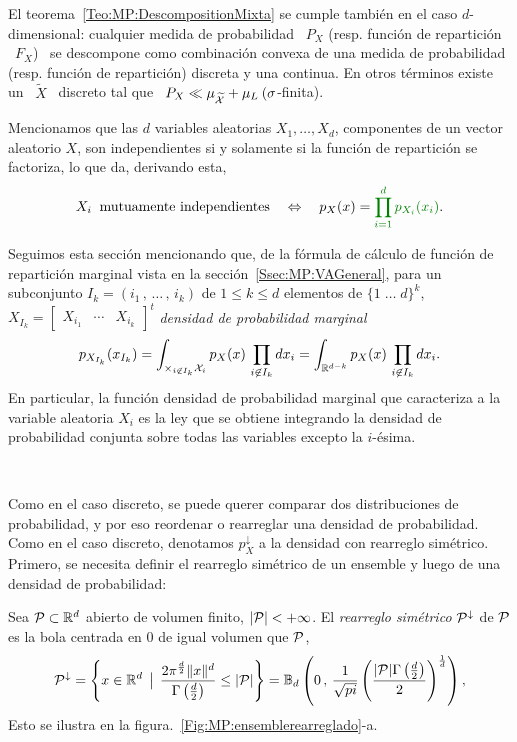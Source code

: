 El                                      teorema~\ref{Teo:MP:DescompositionMixta}
se cumple tambi\'en en el caso $d$-dimensional: cualquier medida de probabilidad
\  $P_X$  (resp.  funci\'on  de  repartici\'on \  $F_X$)  \  se descompone  como
combinaci\'on  convexa  de  una  medida  de probabilidad  (resp.   funci\'on  de
repartici\'on)  discreta  y una  continua.   En  otros  t\'erminos existe  un  \
$\widetilde{X}$ \  discreto tal que \  $P_X \ll \mu_{\widetilde{\X}}  + \mu_L \:
(\sigma$-finita).

Mencionamos que las $d$ variables  aleatorias $X_1, \ldots, X_d$, componentes de
un vector  aleatorio $X$, son independientes  si y solamente si  la funci\'on de
repartici\'on se factoriza, lo que da, derivando esta,
%
\[
X_i \:  \mbox{ mutuamente independientes} \quad \Leftrightarrow  \quad p_X(x) =
\modif{\prod_{i=1}^d p_{X_i}(x_i)}.
\]


Seguimos esta secci\'on mencionando que, de la f\'ormula de c\'alculo de funci\'on
de  repartici\'on marginal vista en la secci\'on~\ref{Ssec:MP:VAGeneral},
para un subconjunto $I_k = (i_1 \, , \,  \ldots \, , \, i_k)$ de $1 \le k \le d$
elementos de  $\{ 1 \; \ldots \;  d \}^k$, $X_{I_k} =  \begin{bmatrix} X_{i_1} &
  \cdots & X_{i_k}\end{bmatrix}^t$ \modif{tiene la} {\it densidad de probabilidad marginal}
%
\[
p_{X_{I_k}}(x_{I_k})  = \int_{\times_{i  \not\in  I_k} \X_i}  p_X(x) \,  \prod_{i
    \not\in I_k}  dx_i =  \int_{\Rset^{d-k}} p_X(x) \,  \prod_{i \not\in
      I_k} dx_i.
\]
%
En particular, la funci\'on densidad  de probabilidad marginal que caracteriza a
la variable aleatoria  $X_i$ es la ley que se obtiene  integrando la densidad de
probabilidad conjunta sobre todas las variables excepto la $i$-\'esima.

\

Como  en  el caso  discreto,  se puede  querer  comparar  dos distribuciones  de
probabilidad, y  por eso  reordenar o rearreglar  una densidad  de probabilidad.
Como en el caso discreto, denotamos $p_X^\downarrow$ a la densidad con rearreglo
sim\'etrico.   Primero,  se necesita  definir  el  rearreglo  sim\'etrico de  un
ensemble y luego de una densidad de probabilidad:
%
\begin{definicion}
\label{Def:MP:RearregloConjunto}
%
  Sea $\P \subset \Rset^d$ abierto de  volumen finito, $|\P| < +\infty$.  El {\it
    rearreglo sim\'etrico} $\P^\downarrow$  de $\P$ es la bola  centrada en 0 de
 igual volumen que $\P$, \ie
  \[
  \P^\downarrow  =   \left\{  x   \in  \Rset^d  \tq   \frac{2  \pi^{\frac{d}{2}}
      \|x\|^d}{\Gamma\left(\frac{d}{2}\right)} \le |\P| \right\} = \Bset_d\left(
    0  \,  , \,  \frac1{\sqrt{pi}}  \left(  \frac{|\P| \Gamma\left(  \frac{d}{2}
        \right)}{2} \right)^{\frac1d} \right),
  \]
  Esto se ilustra en la figura.~\ref{Fig:MP:ensemblerearreglado}-a.
\end{definicion}


